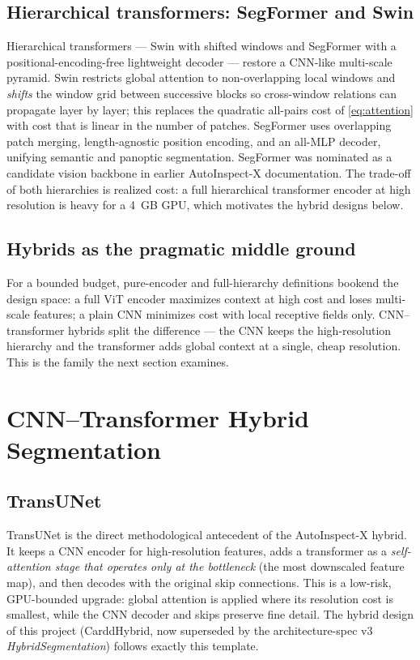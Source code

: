 \documentclass[conference]{IEEEtran}
\begin{document}
\subsection{Hierarchical transformers: SegFormer and Swin}
Hierarchical transformers --- Swin \cite{swin2021} with shifted windows and
SegFormer \cite{segformer2021} with a positional-encoding-free lightweight
decoder --- restore a CNN-like multi-scale pyramid. Swin restricts global
attention to non-overlapping local windows and \emph{shifts} the window grid
between successive blocks so cross-window relations can propagate layer by
layer; this replaces the quadratic all-pairs cost of
\eqref{eq:attention} with cost that is linear in the number of patches.
SegFormer uses overlapping patch merging, length-agnostic position encoding,
and an all-MLP decoder, unifying semantic and panoptic segmentation. SegFormer
was nominated as a candidate vision backbone in earlier AutoInspect-X
documentation. The trade-off of both hierarchies is realized cost: a full
hierarchical transformer encoder at high resolution is heavy for a 4~GB GPU,
which motivates the hybrid designs below.

\subsection{Hybrids as the pragmatic middle ground}
For a bounded budget, pure-encoder and full-hierarchy definitions bookend the
design space: a full ViT encoder maximizes context at high cost and loses
multi-scale features; a plain CNN minimizes cost with local receptive fields
only. CNN--transformer hybrids split the difference --- the CNN keeps the
high-resolution hierarchy and the transformer adds global context at a single,
cheap resolution. This is the family the next section examines.

\section{CNN--Transformer Hybrid Segmentation}
\label{sec:hybrid}
\subsection{TransUNet}
TransUNet \cite{transunet2021} is the direct methodological antecedent of the
AutoInspect-X hybrid. It keeps a CNN encoder for high-resolution features, adds a
transformer as a \emph{self-attention stage that operates only at the
bottleneck} (the most downscaled feature map), and then decodes with the
original skip connections. This is a low-risk, GPU-bounded upgrade: global
attention is applied where its resolution cost is smallest, while the CNN
decoder and skips preserve fine detail. The hybrid design of this project
(CarddHybrid, now superseded by the architecture-spec v3 \emph{HybridSegmentation})
follows exactly this template.
\end{document}
